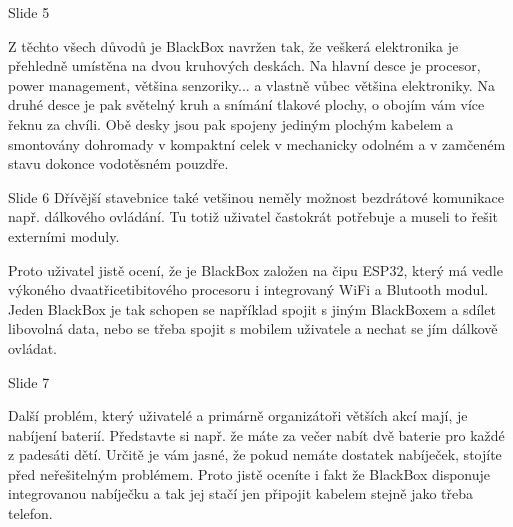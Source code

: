 
Slide 5

Z těchto všech důvodů je BlackBox navržen tak, že  %
veškerá elektronika je přehledně umístěna na dvou kruhových deskách.
Na hlavní desce je procesor, power management, většina
senzoriky... a vlastně vůbec většina elektroniky. Na druhé desce je pak světelný kruh a snímání tlakové plochy, 
o obojím vám více řeknu za chvíli.
Obě desky jsou pak spojeny jediným plochým kabelem a smontovány dohromady v kompaktní celek 
v mechanicky odolném a v zamčeném stavu dokonce vodotěsném pouzdře. %


Slide 6
Dřívější stavebnice také vetšinou neměly možnost bezdrátové komunikace např. dálkového ovládání.
Tu totiž uživatel častokrát potřebuje a museli to řešit externími moduly.

Proto uživatel jistě ocení, že je BlackBox založen na čipu ESP32, 
který má vedle výkoného dvaatřicetibitového procesoru i integrovaný WiFi a Blutooth modul. 
Jeden BlackBox je tak schopen se například spojit s jiným BlackBoxem a sdílet libovolná data, 
nebo se třeba spojit s mobilem uživatele a nechat se jím dálkově ovládat. %

Slide 7

Další problém, který uživatelé a primárně organizátoři větších akcí mají, je nabíjení baterií. 
Představte si např. že máte za večer nabít dvě baterie pro každé z padesáti dětí. Určitě je vám jasné, že pokud 
nemáte dostatek nabíječek, stojíte před neřešitelným problémem.
Proto jistě oceníte i fakt že BlackBox disponuje integrovanou nabíječku a tak jej stačí 
jen připojit kabelem stejně jako třeba telefon.


